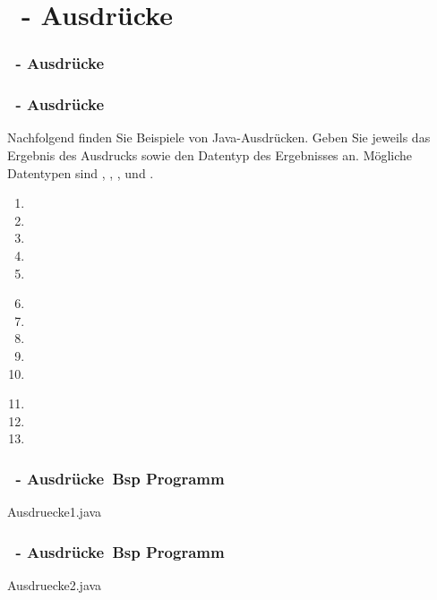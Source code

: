 \def\stitle{\theexercise\ - Ausdrücke}
\section{\stitle}
\begin{frame}%
  \frametitle{\stitle}%
\tableofcontents[current]
\end{frame}


\begin{frame}[t]
  \frametitle{\stitle}

Nachfolgend finden Sie Beispiele von Java-Ausdrücken.
Geben Sie jeweils das Ergebnis des Ausdrucks sowie den Datentyp des Ergebnisses an.
Mögliche Datentypen sind , , ,  und .
\begin{center}
\begin{minipage}{0.3\textwidth}
\begin{enumerate}
\item {}
\item {}
\item {}
\item {}
\item {}
\end{enumerate}
\end{minipage}
\begin{minipage}{0.3\textwidth}
\begin{enumerate}
\setcounter{enumi}{5}
\item {}
\item {}
\item {}
\item {}
\item {}
\end{enumerate}
\end{minipage}
\begin{minipage}{0.3\textwidth}
\begin{enumerate}
\setcounter{enumi}{10}
\item {}
\item {}
\item {}
\end{enumerate}
\end{minipage}
\end{center}

\end{frame}

\begin{frame}[t]%
  \frametitle{\stitle\ Bsp Programm}


{\getexercisefolder Ausdruecke1.java}
\end{frame}


\begin{frame}[t]%
  \frametitle{\stitle\ Bsp Programm}


{\getexercisefolder Ausdruecke2.java}
\end{frame}

